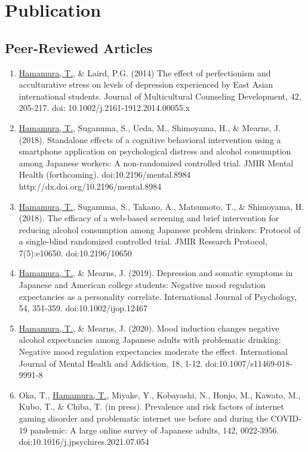 \documentclass{article}
\begin{document}
\section{Publication}
\subsection{Peer-Reviewed Articles}
\begin{enumerate}
	\item \underline{Hamamura, T.}, \& Laird, P.G. (2014) The effect of perfectionism and acculturative stress on levels of depression experienced by East Asian international students. Journal of Multicultural Counseling Development, 42, 205-217. doi: 10.1002/j.2161-1912.2014.00055.x
	\item \underline{Hamamura, T.}, Suganuma, S., Ueda, M., Shimoyama, H., \& Mearns, J. (2018). Standalone effects of a cognitive behavioral intervention using a smartphone application on psychological distress and alcohol consumption among Japanese workers: A non-randomized controlled trial. JMIR Mental Health (forthcoming). doi:10.2196/mental.8984 http://dx.doi.org/10.2196/mental.8984
	\item \underline{Hamamura, T.}, Suganuma, S., Takano, A., Matsumoto, T., \& Shimoyama, H. (2018). The efficacy of a web-based screening and brief intervention for reducing alcohol consumption among Japanese problem drinkers: Protocol of a single-blind randomized controlled trial. JMIR Research Protocol, 7(5):e10650. doi:10.2196/10650
	\item \underline{Hamamura, T.}, \& Mearns, J. (2019). Depression and somatic symptoms in Japanese and American college students: Negative mood regulation expectancies as a personality correlate. International Journal of Psychology, 54, 351-359. doi:10.1002/ijop.12467
	\item \underline{Hamamura, T.}, \& Mearns, J. (2020). Mood induction changes negative alcohol expectancies among Japanese adults with problematic drinking: Negative mood regulation expectancies moderate the effect. International Journal of Mental Health and Addiction, 18, 1-12. doi:10.1007/s11469-018-9991-8
	\item Oka, T., \underline{Hamamura, T.}, Miyake, Y.,  Kobayashi, N., Honjo, M., Kawato, M., Kubo, T., \& Chiba, T. (in press). Prevalence and risk factors of internet gaming disorder and problematic internet use before and during the COVID-19 pandemic: A large online survey of Japanese adults, 142, 0022-3956. doi:10.1016/j.jpsychires.2021.07.054
\end{enumerate}
\end{document}
